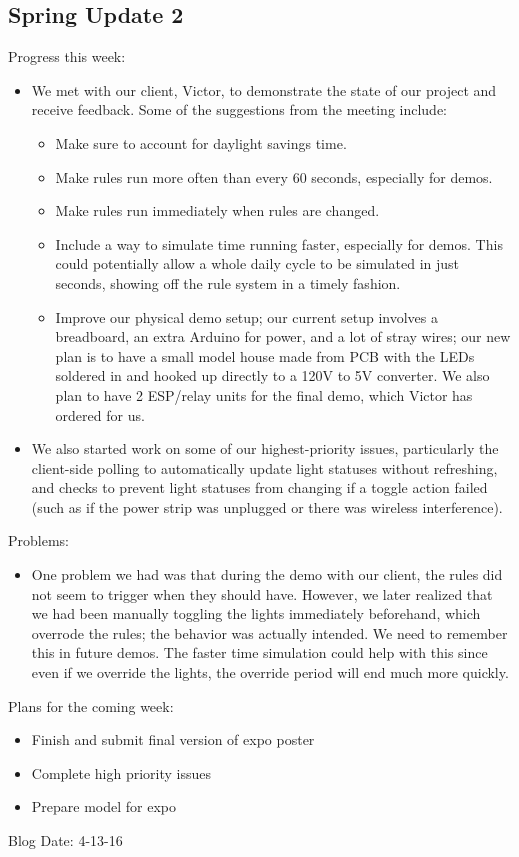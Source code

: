\subsection{Spring Update 2}
Progress this week:
\begin{itemize}
\item We met with our client, Victor, to demonstrate the state of our project and receive feedback.  Some of the suggestions from the meeting include:
\begin{itemize}
\item Make sure to account for daylight savings time.
\item Make rules run more often than every 60 seconds, especially for demos.
\item Make rules run immediately when rules are changed.
\item Include a way to simulate time running faster, especially for demos.  This could potentially allow a whole daily cycle to be simulated in just seconds, showing off the rule system in a timely fashion.
\item Improve our physical demo setup; our current setup involves a breadboard, an extra Arduino for power, and a lot of stray wires; our new plan is to have a small model house made from PCB with the LEDs soldered in and hooked up directly to a 120V to 5V converter.  We also plan to have 2 ESP/relay units for the final demo, which Victor has ordered for us.
\end{itemize}
\item We also started work on some of our highest-priority issues, particularly the client-side polling to automatically update light statuses without refreshing, and checks to prevent light statuses from changing if a toggle action failed (such as if the power strip was unplugged or there was wireless interference).
\end{itemize}
Problems:
\begin{itemize}
\item One problem we had was that during the demo with our client, the rules did not seem to trigger when they should have.  However, we later realized that we had been manually toggling the lights immediately beforehand, which overrode the rules; the behavior was actually intended.  We need to remember this in future demos.  The faster time simulation could help with this since even if we override the lights, the override period will end much more quickly.
\end{itemize}
Plans for the coming week: 
\begin{itemize}
\item Finish and submit final version of expo poster
\item Complete high priority issues
\item Prepare model for expo
\end{itemize}
Blog Date: 4-13-16

